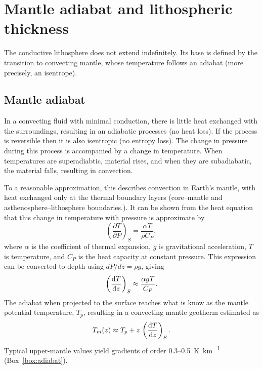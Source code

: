 \section{Mantle adiabat and lithospheric thickness}

The conductive lithosphere does not extend indefinitely. Its base is defined by the transition to convecting mantle, whose temperature follows an adiabat (more precisely, an isentrope).

\subsection{Mantle adiabat}
In a convecting fluid with minimal conduction, there is little heat exchanged with the surroundings, resulting in an adiabatic processes (no heat loss). If the process is reversible then it is also isentropic (no entropy loss). The change in pressure during this process is accompanied by a change in temperature.  When temperatures are superadiabtic, material rises, and when they are subadiabatic, the material falls, resulting in convection.

To a reasonable approximation, this describes convection in Earth's mantle, with heat exchanged only at the thermal boundary layers (core--mantle and asthenosphere--lithosphere boundaries.).  It can be shown from the heat equation that this change in temperature with pressure is approximate by
\[
    \left(\frac{\partial T}{\partial P}\right)_S = \frac{\alpha T}{\rho C_P},
\]
where $\alpha$ is the coefficient of thermal expansion, $g$ is gravitational
acceleration, $T$ is temperature, and $C_P$ is the heat capacity at constant
pressure.  This expression can be converted to depth using $dP/dz = \rho g$, giving
\[
    \left(\dv{T}{z}\right)_S \approx \frac{\alpha g T}{C_P}.
\]
The adiabat when projected to the surface reaches what is know as the mantle potential temperature, $T_p$, resulting in a convecting mantle geotherm estimated as
\[
    T_m(z) \approx T_p + z\, \left( \dv{T}{z} \right)_S.
\]
Typical upper-mantle values yield gradients of order 0.3--\SI{0.5}{K.km^{-1}} (Box~\ref{box:adiabat}).

